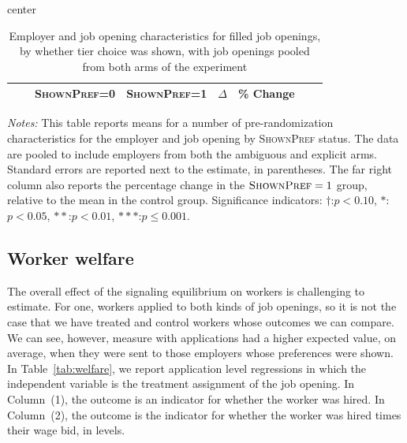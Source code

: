 \documentclass[12pt]{article}
\newcommand{\starlanguage}{Significance indicators: $\dagger$:$p < 0.10$, $*$:$p < 0.05$, $**$:$p < 0.01$, $***$:$p \le 0.001$.}
\begin{document}
\begin{table}
\begin{center}
\caption{Employer and job opening characteristics for filled job openings,  by whether tier choice was shown, with job openings pooled from both arms of the experiment}
\label{tab:balance_big_filled}
\begin{small}
\begin{adjustbox}{center}
\begin{tabular}{lllccccc}
\toprule
&   & \multicolumn{1}{c}{\parbox[t][][t]{2.3cm}{{\footnotesize \textsc{ShownPref}=0}}}
&     \multicolumn{1}{c}{\parbox[t][][t]{2.3cm}{\footnotesize  \textsc{ShownPref=1}}}
&     \multicolumn{1}{c}{\parbox[t][][t]{2.0cm}{$\Delta$}}
&     \multicolumn{1}{c}{\parbox[t][][t]{1cm}{\% Change}}
\\
\hline



\bottomrule
\end{tabular}
\end{adjustbox}
\end{small}
\end{center}
\begin{minipage}{1.0 \textwidth}
\begin{footnotesize}
\begin{singlespace}
  \emph{Notes:} This table reports means for a number of pre-randomization characteristics for the employer and job opening by \textsc{ShownPref} status.
  The data are pooled to include employers from both the ambiguous and explicit arms.
Standard errors are reported next to the estimate, in parentheses.
The far right column also reports the percentage change in the $\textsc{ShownPref}=1$ group, relative to the mean in the control group. 
\starlanguage
\end{singlespace}
\end{footnotesize}
\end{minipage}
\end{table}

\subsection{Worker welfare} \label{sec:welfare}

The overall effect of the signaling equilibrium on workers is challenging to estimate.
For one, workers applied to both kinds of job openings, so it is not the case that we have treated and control workers whose outcomes we can compare.
We can see, however, measure with applications had a higher expected value, on average, when they were sent to those employers whose preferences were shown. 
In Table~\ref{tab:welfare}, we report application level regressions in which the independent variable is the treatment assignment of the job opening. 
In Column~(1), the outcome is an indicator for whether the worker was hired.
In Column~(2), the outcome is the indicator for whether the worker was hired times their wage bid, in levels.  
\end{document}
